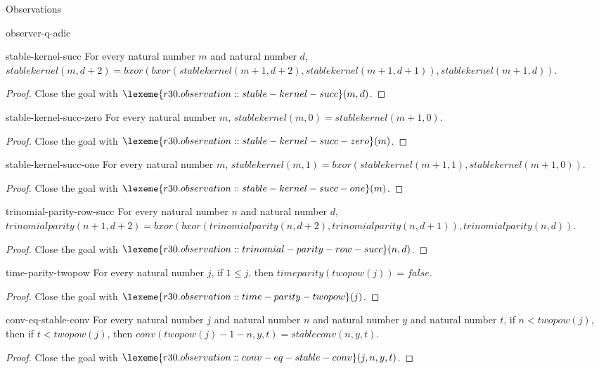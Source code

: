 \begin{lexlean}{Observations}
\begin{section}{observer-q-adic}
\begin{theorem}{stable-kernel-succ}
For every natural number \(m\) and natural number \(d\), \(stablekernel(m, d + 2) = bxor(bxor(stablekernel(m + 1, d + 2), stablekernel(m + 1, d + 1)), stablekernel(m + 1, d))\).
\begin{proof}
Close the goal with \(\lexeme{r30.observation::stable-kernel-succ}(m, d)\).
\end{proof}
\end{theorem}

\begin{theorem}{stable-kernel-succ-zero}
For every natural number \(m\), \(stablekernel(m, 0) = stablekernel(m + 1, 0)\).
\begin{proof}
Close the goal with \(\lexeme{r30.observation::stable-kernel-succ-zero}(m)\).
\end{proof}
\end{theorem}

\begin{theorem}{stable-kernel-succ-one}
For every natural number \(m\), \(stablekernel(m, 1) = bxor(stablekernel(m + 1, 1), stablekernel(m + 1, 0))\).
\begin{proof}
Close the goal with \(\lexeme{r30.observation::stable-kernel-succ-one}(m)\).
\end{proof}
\end{theorem}

\begin{theorem}{trinomial-parity-row-succ}
For every natural number \(n\) and natural number \(d\), \(trinomialparity(n + 1, d + 2) = bxor(bxor(trinomialparity(n, d + 2), trinomialparity(n, d + 1)), trinomialparity(n, d))\).
\begin{proof}
Close the goal with \(\lexeme{r30.observation::trinomial-parity-row-succ}(n, d)\).
\end{proof}
\end{theorem}

\begin{theorem}{time-parity-twopow}
For every natural number \(j\), if \(1 ≤ j\), then \(timeparity(twopow(j)) = false\).
\begin{proof}
Close the goal with \(\lexeme{r30.observation::time-parity-twopow}(j)\).
\end{proof}
\end{theorem}

\begin{theorem}{conv-eq-stable-conv}
For every natural number \(j\) and natural number \(n\) and natural number \(y\) and natural number \(t\), if \(n < twopow(j)\), then if \(t < twopow(j)\), then \(conv(twopow(j) - 1 - n, y, t) = stableconv(n, y, t)\).
\begin{proof}
Close the goal with \(\lexeme{r30.observation::conv-eq-stable-conv}(j, n, y, t)\).
\end{proof}
\end{theorem}


\end{section}
\end{lexlean}
